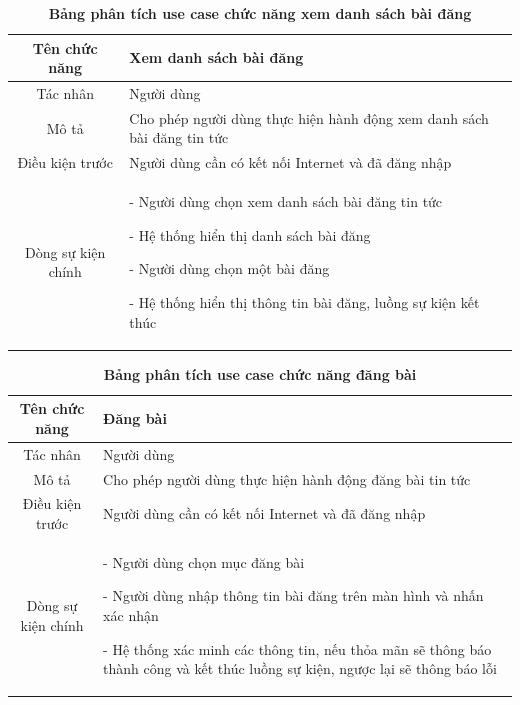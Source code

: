   \begin{table}[H]
    \caption{\bfseries \fontsize{12pt}{0pt}\selectfont Bảng phân tích use case chức năng xem danh sách bài đăng}
    \centering
    \begin{tabularx}{0.9\textwidth}{|c|X|}
      \hline
      \textbf{Tên chức năng} & \textbf{Xem danh sách bài đăng} \\
      \hline
      Tác nhân & Người dùng \\
      \hline
      Mô tả & Cho phép người dùng thực hiện hành động xem danh sách bài đăng tin tức \\
      \hline
      Điều kiện trước & Người dùng cần có kết nối Internet và đã đăng nhập \\
      \hline
      Dòng sự kiện chính & 
        - Người dùng chọn xem danh sách bài đăng tin tức
        
        - Hệ thống hiển thị danh sách bài đăng

        - Người dùng chọn một bài đăng

        - Hệ thống hiển thị thông tin bài đăng, luồng sự kiện kết thúc         
        \\
      \hline
    \end{tabularx}
  \end{table}

  \begin{table}[H]
    \caption{\bfseries \fontsize{12pt}{0pt}\selectfont Bảng phân tích use case chức năng đăng bài}
    \centering
    \begin{tabularx}{0.9\textwidth}{|c|X|}
      \hline
      \textbf{Tên chức năng} & \textbf{Đăng bài} \\
      \hline
      Tác nhân & Người dùng \\
      \hline
      Mô tả & Cho phép người dùng thực hiện hành động đăng bài tin tức \\
      \hline
      Điều kiện trước & Người dùng cần có kết nối Internet và đã đăng nhập \\
      \hline
      Dòng sự kiện chính & 
        - Người dùng chọn mục đăng bài

        - Người dùng nhập thông tin bài đăng trên màn hình và nhấn xác nhận

        - Hệ thống xác minh các thông tin, nếu thỏa mãn sẽ thông báo thành công và kết thúc luồng sự kiện, ngược lại 
        sẽ thông báo lỗi         
        \\
      \hline
    \end{tabularx}
  \end{table}

